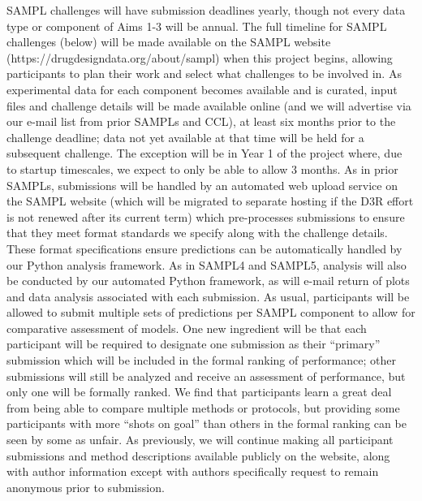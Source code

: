 \documentclass[11pt]{article}
\begin{document}
SAMPL challenges will have submission deadlines yearly, though not every data type or component of Aims 1-3 will be annual.
The full timeline for SAMPL challenges (below) will be made available on the SAMPL website (https://drugdesigndata.org/about/sampl) when this project begins, allowing participants to plan their work and select what challenges to be involved in.
As experimental data for each component becomes available and is curated, input files and challenge details will be made available online (and we will advertise via our e-mail list from prior SAMPLs and CCL), at least six months prior to the challenge deadline; data not yet available at that time will be held for a subsequent challenge.
The exception will be in Year 1 of the project where, due to startup timescales, we expect to only be able to allow 3 months. 
As in prior SAMPLs, submissions will be handled by an automated web upload service on the SAMPL website (which will be migrated to separate hosting if the D3R effort is not renewed after its current term) which pre-processes submissions to ensure that they meet format standards we specify along with the challenge details. 
These format specifications ensure predictions can be automatically handled by our Python analysis framework.
As in SAMPL4 and SAMPL5, analysis will also be conducted by our automated Python framework, as will e-mail return of plots and data analysis associated with each submission.
As usual, participants will be allowed to submit multiple sets of predictions per SAMPL component to allow for comparative assessment of models.
One new ingredient will be that each participant will be required to designate one submission as their ``primary'' submission which will be included in the formal ranking of performance; other submissions will still be analyzed and receive an assessment of performance, but only one will be formally ranked.
We find that participants learn a great deal from being able to compare multiple methods or protocols, but providing some participants with more ``shots on goal'' than others in the formal ranking can be seen by some as unfair.
As previously, we will continue making all participant submissions and method descriptions available publicly on the website, along with author information except with authors specifically request to remain anonymous prior to submission.
\end{document}
